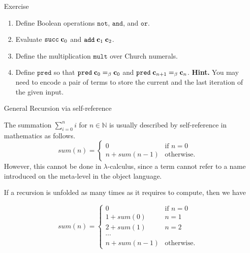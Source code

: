 \begin{frame}{Exercise}
  \begin{enumerate}
    \item Define Boolean operations $\mathtt{not}$, $\mathtt{and}$, and $\mathtt{or}$.
    \item Evaluate $\mathtt{succ}\;\mathbf{c}_0$ and $\mathtt{add}\;\mathbf{c}_{1}\;\mathbf{c}_{2}$. 
    \item Define the multiplication $\mathtt{mult}$ over Church numerals.
    \item Define $\mathtt{pred}$ so that $\mathtt{pred}\;\mathbf{c}_0 =_\beta
      \mathbf{c}_{0}$ and $\mathtt{pred}\;\mathbf{c}_{n+1} =_\beta \mathbf{c}_{n}$.
      \textbf{Hint.} You may need to encode a pair of terms to store the
      current and the last iteration of the given input. 

  \end{enumerate}
\end{frame}
\begin{frame}{General Recursion via self-reference}

  The summation $\sum_{i = 0}^{n} i$ for $n \in \mathbb{N}$ is usually
  described by self-reference in mathematics as follows.
\[
  \mathit{sum}(n) =
    \begin{cases} 
     0 & \text{if } n = 0 \\
     n + \mathit{sum}(n - 1)  & \text{otherwise}.
    \end{cases}
\]
However, this cannot be done in $\lambda$-calculus,
since a term cannot refer to a name introduced on the meta-level in the
object language. 

If a recursion is unfolded as many times as it requires to compute, then we have

\[
  \mathit{sum}(n) =
    \begin{cases} 
     0 & \text{if } n = 0 \\
     1 + \mathit{sum}(0) & n = 1 \\
     2 + \mathit{sum}(1) & n = 2 \\
     \cdots \\
     n + \mathit{sum}(n - 1)  & \text{otherwise}.
    \end{cases}
\]


\end{frame}

